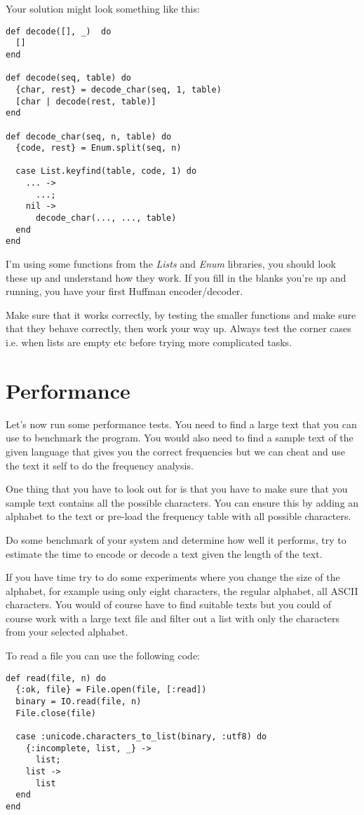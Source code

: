 \documentclass[a4paper,11pt]{article}
\begin{document}
Your solution might look something like this:

\begin{verbatim}
def decode([], _)  do
  []
end

def decode(seq, table) do
  {char, rest} = decode_char(seq, 1, table)
  [char | decode(rest, table)]
end

def decode_char(seq, n, table) do
  {code, rest} = Enum.split(seq, n)

  case List.keyfind(table, code, 1) do
    ... ->
      ...;
    nil ->
      decode_char(..., ..., table)
  end
end
\end{verbatim}

I'm using some functions from the {\em Lists} and {\em Enum} libraries, you should look
these up and understand how they work. If you fill in the blanks
you're up and running, you have your first Huffman encoder/decoder.

Make sure that it works correctly, by testing the smaller functions
and make sure that they behave correctly, then work your way
up. Always test the corner cases i.e. when lists are empty etc before
trying more complicated tasks.



\section{Performance}

Let's now run some performance tests. You need to find a large text
that you can use to benchmark the program. You would also need to find
a sample text of the given language that gives you the correct
frequencies but we can cheat and use the text it self to do the
frequency analysis. 

One thing that you have to look out for is that you have to make sure
that you sample text contains all the possible characters. You can
ensure this by adding an alphabet to the text or pre-load the
frequency table with all possible characters.

Do some benchmark of your system and determine how well it
performs, try to estimate the time to encode or decode a text given
the length of the text. 

If you have time try to do some experiments where you change the size
of the alphabet, for example using only eight characters, the regular
alphabet, all ASCII characters. You would of course have to find
suitable texts but you could of course work with a large text file and
filter out a list with only the characters from your selected alphabet.


To read a file you can use the following code:

\begin{verbatim}
def read(file, n) do
  {:ok, file} = File.open(file, [:read])
  binary = IO.read(file, n)
  File.close(file)
  
  case :unicode.characters_to_list(binary, :utf8) do
    {:incomplete, list, _} ->
      list;
    list ->
      list
  end
end
\end{verbatim}
\end{document}
